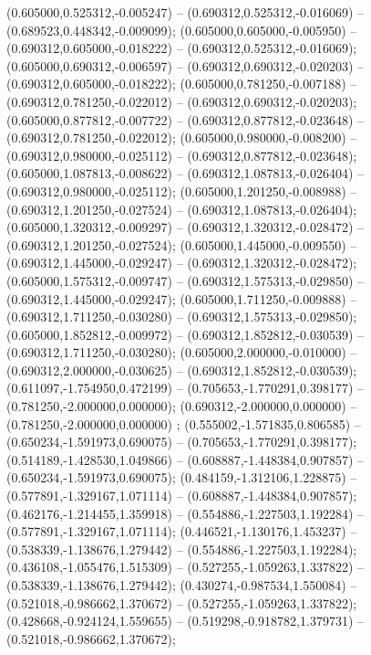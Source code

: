  (0.605000,0.525312,-0.005247) -- (0.690312,0.525312,-0.016069) -- (0.689523,0.448342,-0.009099);
 (0.605000,0.605000,-0.005950) -- (0.690312,0.605000,-0.018222) -- (0.690312,0.525312,-0.016069);
 (0.605000,0.690312,-0.006597) -- (0.690312,0.690312,-0.020203) -- (0.690312,0.605000,-0.018222);
 (0.605000,0.781250,-0.007188) -- (0.690312,0.781250,-0.022012) -- (0.690312,0.690312,-0.020203);
 (0.605000,0.877812,-0.007722) -- (0.690312,0.877812,-0.023648) -- (0.690312,0.781250,-0.022012);
 (0.605000,0.980000,-0.008200) -- (0.690312,0.980000,-0.025112) -- (0.690312,0.877812,-0.023648);
 (0.605000,1.087813,-0.008622) -- (0.690312,1.087813,-0.026404) -- (0.690312,0.980000,-0.025112);
 (0.605000,1.201250,-0.008988) -- (0.690312,1.201250,-0.027524) -- (0.690312,1.087813,-0.026404);
 (0.605000,1.320312,-0.009297) -- (0.690312,1.320312,-0.028472) -- (0.690312,1.201250,-0.027524);
 (0.605000,1.445000,-0.009550) -- (0.690312,1.445000,-0.029247) -- (0.690312,1.320312,-0.028472);
 (0.605000,1.575312,-0.009747) -- (0.690312,1.575313,-0.029850) -- (0.690312,1.445000,-0.029247);
 (0.605000,1.711250,-0.009888) -- (0.690312,1.711250,-0.030280) -- (0.690312,1.575313,-0.029850);
 (0.605000,1.852812,-0.009972) -- (0.690312,1.852812,-0.030539) -- (0.690312,1.711250,-0.030280);
 (0.605000,2.000000,-0.010000) -- (0.690312,2.000000,-0.030625) -- (0.690312,1.852812,-0.030539);
 (0.611097,-1.754950,0.472199) -- (0.705653,-1.770291,0.398177) -- (0.781250,-2.000000,0.000000);
 (0.690312,-2.000000,0.000000) -- (0.781250,-2.000000,0.000000) ;
 (0.555002,-1.571835,0.806585) -- (0.650234,-1.591973,0.690075) -- (0.705653,-1.770291,0.398177);
 (0.514189,-1.428530,1.049866) -- (0.608887,-1.448384,0.907857) -- (0.650234,-1.591973,0.690075);
 (0.484159,-1.312106,1.228875) -- (0.577891,-1.329167,1.071114) -- (0.608887,-1.448384,0.907857);
 (0.462176,-1.214455,1.359918) -- (0.554886,-1.227503,1.192284) -- (0.577891,-1.329167,1.071114);
 (0.446521,-1.130176,1.453237) -- (0.538339,-1.138676,1.279442) -- (0.554886,-1.227503,1.192284);
 (0.436108,-1.055476,1.515309) -- (0.527255,-1.059263,1.337822) -- (0.538339,-1.138676,1.279442);
 (0.430274,-0.987534,1.550084) -- (0.521018,-0.986662,1.370672) -- (0.527255,-1.059263,1.337822);
 (0.428668,-0.924124,1.559655) -- (0.519298,-0.918782,1.379731) -- (0.521018,-0.986662,1.370672);
